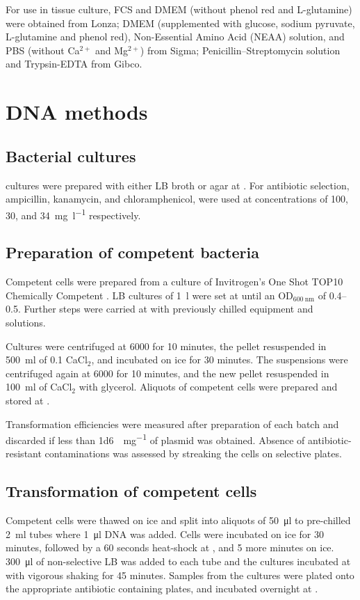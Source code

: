   For use in tissue culture, FCS and DMEM (without phenol red and L-glutamine)
  were obtained from Lonza; DMEM (supplemented with glucose, sodium pyruvate,
  L-glutamine and phenol red), Non-Essential Amino Acid (NEAA) solution, and
  PBS (without Ca$^{2+}$ and Mg$^{2+}$) from Sigma; Penicillin--Streptomycin
  solution and Trypsin-EDTA from Gibco.

  \section{DNA methods}
    \subsection{Bacterial cultures}
       cultures were prepared with either LB broth or agar
      at . For antibiotic selection, ampicillin, kanamycin, and
      chloramphenicol, were used at concentrations of 100, 30,
      and \SI{34}{\mg\per\l} respectively.

    \subsection{Preparation of competent bacteria}
      Competent  cells were prepared from a culture of
      Invitrogen's One Shot TOP10 Chemically Competent . LB
      cultures of \SI{1}{\l} were set at  until an OD$_{\SI{600}{\nm}}$
      of \numrange{0.4}{0.5}. Further steps were carried at  with
      previously chilled equipment and solutions.

      Cultures were centrifuged at \SI{6000}{\gn} for 10 minutes, the
      pellet resuspended in \SI{500}{\ml} of \SI{0.1}{\mM} CaCl$_2$, and
      incubated on ice for 30 minutes. The suspensions were centrifuged
      again at \SI{6000}{\gn} for 10 minutes, and the new pellet resuspended in
      \SI{100}{\ml} of CaCl$_2$ with  glycerol. Aliquots of
      competent cells were prepared and stored at .

      Transformation efficiencies were measured after preparation of each
      batch and discarded if less than \SI{1d6}{\cfu\per\mg} of plasmid was
      obtained. Absence of antibiotic-resistant contaminations was assessed
      by streaking the cells on selective plates.

    \subsection{Transformation of competent cells}
      Competent cells were thawed on ice and split into aliquots of
      \SI{50}{\ul} to pre-chilled \SI{2}{\ml} tubes where \SI{1}{\ul} DNA
      was added. Cells were incubated on ice for 30 minutes, followed by a
      60 seconds heat-shock at , and 5 more minutes on ice.
      \SI{300}{\ul} of non-selective LB was added to each tube and the
      cultures incubated at  with vigorous shaking for 45 minutes.
      Samples from the cultures were plated onto the appropriate
      antibiotic containing plates, and incubated overnight at .

